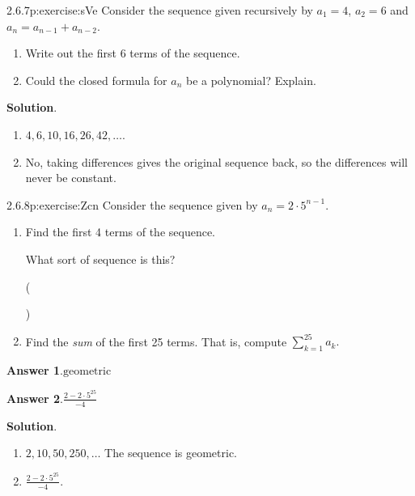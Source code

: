 \documentclass[twoside,11pt,]{book}
\newcommand{\blocktitlefont}{\relax}
\numberwithin{equation}{chapter}
\begin{document}
\begin{divisionsolution}{2.6.7}{}{p:exercise:sVe}%
Consider the sequence given recursively by \(a_1 = 4\), \(a_2 = 6\) and \(a_n = a_{n-1} + a_{n-2}\).%
\begin{enumerate}[label=(\alph*)]
\item{}Write out the first 6 terms of the sequence.%
\item{}Could the closed formula for \(a_n\) be a polynomial? Explain.%
\end{enumerate}
%
\par\smallskip%
\noindent\textbf{\blocktitlefont Solution}.\quad{}%
\begin{enumerate}[label=(\alph*)]
\item{}\(4, 6, 10, 16, 26, 42, \ldots\).%
\item{}No, taking differences gives the original sequence back, so the differences will never be constant.%
\end{enumerate}
%
\end{divisionsolution}%
\begin{divisionsolution}{2.6.8}{}{p:exercise:Zcn}%
Consider the sequence given by \(a_n = 2\cdot 5^{n-1}\text{.}\)%
\begin{enumerate}[label=(\alph*)]
\item{}Find the first 4 terms of the sequence.%
\par
What sort of sequence is this?%
\par
\quad()\quad
%
\item{}Find the \emph{sum} of the first 25 terms. That is, compute \(\sum_{k=1}^{25}a_k\text{.}\)%
\end{enumerate}
%
\par\smallskip%
\noindent\textbf{\blocktitlefont Answer 1}.\quad{}\(\text{geometric}\)%
\par\smallskip%
\noindent\textbf{\blocktitlefont Answer 2}.\quad{}\(\frac{2-2\cdot 5^{25}}{-4}\)%
\par\smallskip%
\noindent\textbf{\blocktitlefont Solution}.\quad{}%
\begin{enumerate}[label=(\alph*)]
\item{}\(2, 10, 50, 250, \ldots\) The sequence is geometric.%
\item{}\(\frac{2 - 2\cdot 5^{25}}{-4}\text{.}\)%
\end{enumerate}
%
\end{divisionsolution}%
\end{document}
